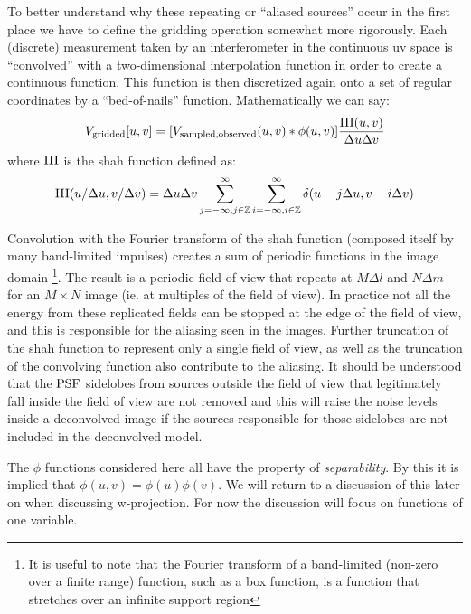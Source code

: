  To better understand why these repeating or ``aliased sources'' occur in the first place we have to define the gridding operation somewhat more 
 rigorously. Each (discrete) measurement taken by an interferometer in the continuous uv space  is ``convolved'' with a two-dimensional interpolation 
 function in order to create a continuous function. This function is then discretized again onto a set of regular coordinates by a 
 ``bed-of-nails'' function. Mathematically we can say:
 \begin{equation}
  V_{\text{gridded}}[u,v] = [V_{\text{sampled,observed}}(u,v)*\phi(u,v)]\frac{\textrm{III}(u,v)}{\Delta{u}\Delta{v}}
 \end{equation}
 where $\textrm{III}$ is the shah function defined as:
 \begin{equation}
  \textrm{III}(u/\Delta{u},v/\Delta{v})=\Delta{u}\Delta{v}\sum_{j=-\infty,j\in\mathbb{Z}}^{\infty}{\sum_{i=-\infty,i\in\mathbb{Z}}^{\infty}{\delta{(u-j\Delta{u},v-i\Delta{v})}}}
 \end{equation}
 
 Convolution with the Fourier transform of the shah function (composed itself by many band-limited impulses) creates a sum of periodic functions
 in the image domain \footnote{It is useful to note that the Fourier transform of a band-limited (non-zero over a finite range) function, 
 such as a box function, is a function that stretches over an infinite support region}. The result is a periodic field of view that repeats at
 $M\Delta{l}$ and $N\Delta{m}$ for an $M\times N$ image (ie. at multiples of the field of view). In practice not all the energy from 
 these replicated fields can be stopped at the edge of the field of view, and this is responsible for the aliasing seen in the images. Further
 truncation of the shah function to represent only a single field of view, as well as the truncation of the convolving function also 
 contribute to the aliasing. It should be understood that the $\textrm{PSF}$ sidelobes from sources outside the field of view that legitimately fall inside
 the field of view are not removed and this will raise the noise levels inside a deconvolved image if the sources responsible for those sidelobes are not
 included in the deconvolved model.
 
 The $\phi$ functions considered here all have the property of \emph{separability}. By this it is implied that $\phi(u,v) = \phi(u)\phi(v)$. We will return
 to a discussion of this later on when discussing w-projection. For now the discussion will focus on functions of one variable.
 

